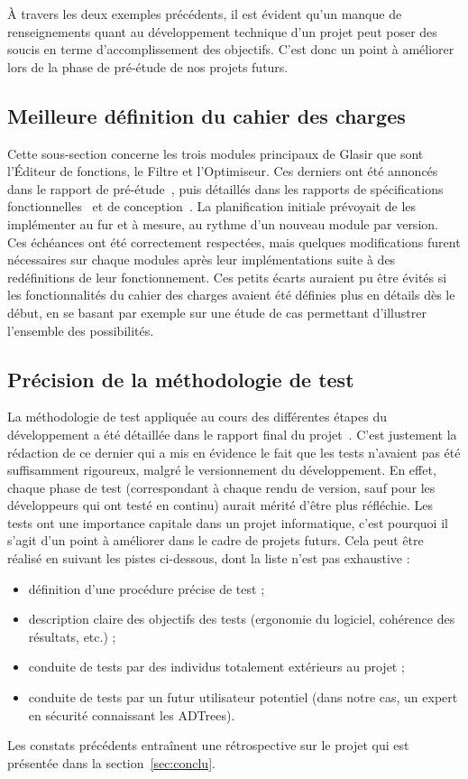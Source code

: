 À travers les deux exemples précédents, il est évident qu'un manque de renseignements quant au développement technique d'un projet peut poser des soucis en terme d'accomplissement des objectifs. C'est donc un point à améliorer lors de la phase de pré-étude de nos projets futurs.

\subsection{Meilleure définition du cahier des charges}
\label{ssec:cahier-charges}

Cette sous-section concerne les trois modules principaux de Glasir que sont l'Éditeur de fonctions, le Filtre et l'Optimiseur. Ces derniers ont été annoncés dans le rapport de pré-étude~\cite{pre_etude}, puis détaillés dans les rapports de spécifications fonctionnelles~\cite{spec_fonc} et de conception~\cite{conception}. La planification initiale prévoyait de les implémenter au fur et à mesure, au rythme d'un nouveau module par version. Ces échéances ont été correctement respectées, mais quelques modifications furent nécessaires sur chaque modules après leur implémentations suite à des redéfinitions de leur fonctionnement. Ces petits écarts auraient pu être évités si les fonctionnalités du cahier des charges avaient été définies plus en détails dès le début, en se basant par exemple sur une étude de cas permettant d'illustrer l'ensemble des possibilités.

\subsection{Précision de la méthodologie de test}
\label{ssec:methodoTest}

La méthodologie de test appliquée au cours des différentes étapes du développement a été détaillée dans le rapport final du projet~\cite{rapportFinal}. C'est justement la rédaction de ce dernier qui a mis en évidence le fait que les tests n'avaient pas été suffisamment rigoureux, malgré le versionnement du développement. En effet, chaque phase de test (correspondant à chaque rendu de version, sauf pour les développeurs qui ont testé en continu) aurait mérité d'être plus réfléchie. Les tests ont une importance capitale dans un projet informatique, c'est pourquoi il s'agit d'un point à améliorer dans le cadre de projets futurs. Cela peut être réalisé en suivant les pistes ci-dessous, dont la liste n'est pas exhaustive : 

\begin{itemize}
\item définition d'une procédure précise de test ;
\item description claire des objectifs des tests (ergonomie du logiciel, cohérence des résultats, etc.) ;
\item conduite de tests par des individus totalement extérieurs au projet ;
\item conduite de tests par un futur utilisateur potentiel (dans notre cas, un expert en sécurité connaissant les ADTrees).
\end{itemize}

Les constats précédents entraînent une rétrospective sur le projet qui est présentée dans la {\sc section}~\ref{sec:conclu}.